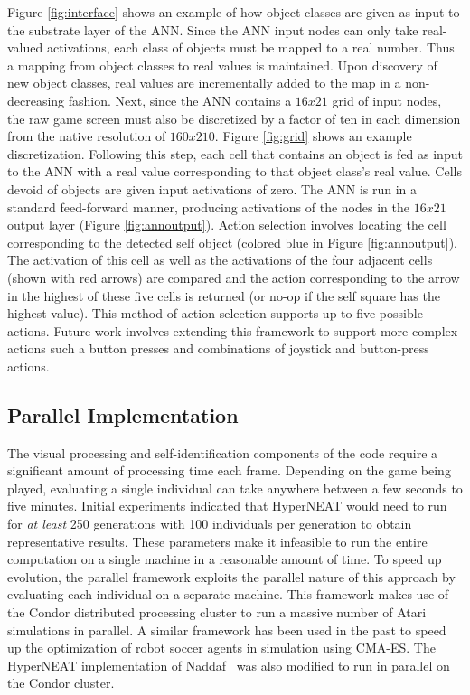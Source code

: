 \documentclass{acm_proc_article-sp}
\begin{document}
Figure \ref{fig:interface} shows an example of how object classes are given as input to the substrate layer of the ANN. Since the ANN input nodes can only take real-valued activations, each class of objects must be mapped to a real number. Thus a mapping from object classes to real values is maintained. Upon discovery of new object classes, real values are incrementally added to the map in a non-decreasing fashion. Next, since the ANN contains a $16x21$ grid of input nodes, the raw game screen must also be discretized by a factor of ten in each dimension from the native resolution of $160x210$. Figure \ref{fig:grid} shows an example discretization. Following this step, each cell that contains an object is fed as input to the ANN with a real value corresponding to that object class's real value. Cells devoid of objects are given input activations of zero. The ANN is run in a standard feed-forward manner, producing activations of the nodes in the $16x21$ output layer (Figure \ref{fig:annoutput}). Action selection involves locating the cell corresponding to the detected self object (colored blue in Figure \ref{fig:annoutput}). The activation of this cell as well as the activations of the four adjacent cells (shown with red arrows) are compared and the action corresponding to the arrow in the highest of these five cells is returned (or no-op if the self square has the highest value). This method of action selection supports up to five possible actions. Future work involves extending this framework to support more complex actions such a button presses and combinations of joystick and button-press actions.

\subsection{Parallel Implementation}
\label{sec:condor}
The visual processing and self-identification components of the code require a significant amount of processing time each frame. Depending on the game being played, evaluating a single individual can take anywhere between a few seconds to five minutes. Initial experiments indicated that HyperNEAT would need to run for \textit{at least} 250 generations with 100 individuals per generation to obtain representative results. These parameters make it infeasible to run the entire computation on a single machine in a reasonable amount of time. To speed up evolution, the parallel framework exploits the parallel nature of this approach by evaluating each individual on a separate machine. This framework makes use of the Condor distributed processing cluster \cite{thain2005distributed} to run a massive number of Atari simulations in parallel. A similar framework has been used in the past to speed up the optimization of robot soccer agents in simulation using CMA-ES\cite{Urieli+MKBS:2010}. The HyperNEAT implementation of Naddaf~\cite{verbancsics10} was also modified to run in parallel on the Condor cluster.
\end{document}
